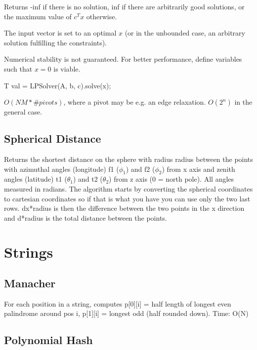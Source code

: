 \documentclass{article}
\begin{document}
Returns -inf if there is no solution, inf if there are arbitrarily good solutions, or the maximum value of $c^T x$ otherwise.

The input vector is set to an optimal $x$ (or in the unbounded case, an arbitrary solution fulfilling the constraints).

Numerical stability is not guaranteed. For better performance, define variables such that $x = 0$ is viable.

 T val = LPSolver(A, b, c).solve(x);
 
 $O(NM * \#pivots)$, where a pivot may be e.g. an edge relaxation. $O(2^n)$ in the general case.



\subsection*{Spherical Distance}
\begin{multicols}{2}
  \columnbreak
  Returns the shortest distance on the sphere with radius radius between the points
 with azimuthal angles (longitude) f1 ($\phi_1$) and f2 ($\phi_2$) from x axis and zenith angles
 (latitude) t1 ($\theta_1$) and t2 ($\theta_2$) from z axis (0 = north pole). All angles measured
 in radians. The algorithm starts by converting the spherical coordinates to cartesian coordinates
 so if that is what you have you can use only the two last rows. dx*radius is then the difference
 between the two points in the x direction and d*radius is the total distance between the points.

\end{multicols}


\vspace*{2cm}

\section*{Strings}


\begin{multicols}{2}

\subsection*{Manacher}
  For each position in a string, computes p[0][i] = half length of
longest even palindrome around pos i, p[1][i] = longest odd (half rounded down).
Time: O(N)
  
  \columnbreak


  \subsection*{Polynomial Hash}
  
\end{multicols}
\end{document}
